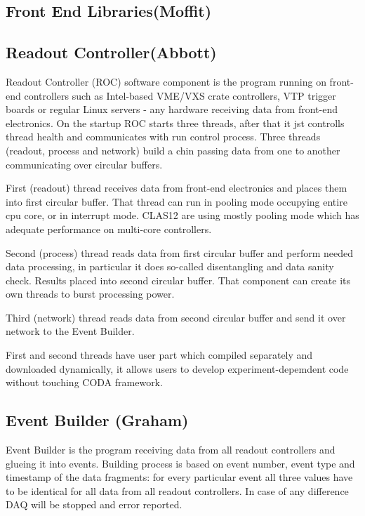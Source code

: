 \subsection{Front End Libraries(Moffit)}




\subsection{Readout Controller(Abbott)}

Readout Controller (ROC) software component is the program running on front-end controllers such as Intel-based VME/VXS crate controllers, VTP trigger boards or regular Linux servers - any hardware receiving data from front-end electronics. On the startup ROC starts three threads, after that it jst controlls thread health and communicates with run control process. Three threads (readout, process and network) build a chin passing data from one to another communicating over circular buffers.

First (readout) thread receives data from front-end electronics and places them into first circular buffer. That thread can run in pooling mode occupying entire cpu core, or in interrupt mode. CLAS12 are using mostly pooling mode which has adequate performance on multi-core controllers.

Second (process) thread reads data from first circular buffer and perform needed data processing, in particular it does so-called disentangling and data sanity check. Results placed into second circular buffer. That component can create its own threads to burst processing power.

Third (network) thread reads data from second circular buffer and send it over network to the Event Builder.

First and second threads have user part which compiled separately and downloaded dynamically, it allows users to develop experiment-depemdent code without touching CODA framework.



\subsection{Event Builder (Graham)}

Event Builder is the program receiving data from all readout controllers and glueing it into events. Building process is based on event number, event type and timestamp of the data fragments: for every particular event all three values have to be identical for all data from all readout controllers. In case of any difference DAQ will be stopped and error reported.

